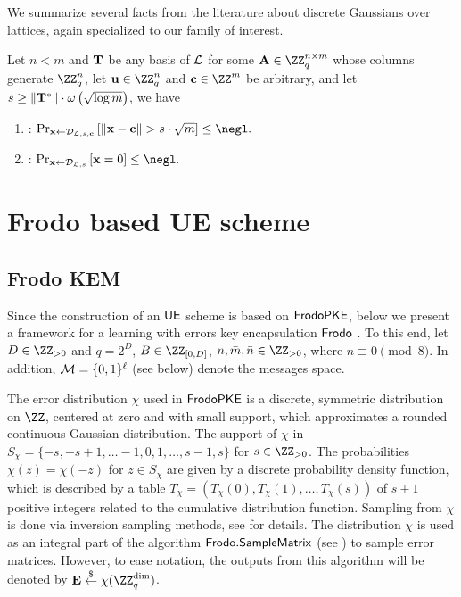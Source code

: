 \documentclass{fundam}
\begin{document}
\vspace{0.5cm}
We summarize several facts from the literature about discrete Gaussians over lattices, again specialized to our family of interest.
\begin{lemma}\label{lem::02}Let $n<m$ and $\mathbf{T}$ be any basis of $\mathcal{L}$ for some $\vr{A}\in\ZZ_{q}^{n\times m}$ whose columns generate $\ZZ_{q}^{n}$, let $\vr{u}\in\ZZ_{q}^{n}$ and $\vr{c}\in\ZZ^{m}$
	be arbitrary, and let $s\geq \| \mathbf{T}^{*} \| \cdot \omega \left( \sqrt{\log{m}} \right)$, we have
	\begin{enumerate}
		\item {\normalfont \cite{micciancio2007worst,cash2012bonsai}:}
		$\Pr_{\vr{x}\gets  \Distr_{\Lat,{s}, \vr{c}}} \left[ \| \vr{x}-\vr{c}\| >  s \cdot \sqrt{m} \right]\leq \negl.$
		
		\item {\normalfont \cite{peikert2006efficient,cash2012bonsai}:} 
		$\Pr_{\vr{x}\gets  \Distr_{\Lat,s}} \left[ \vr{x}=0 \right]\leq \negl.$
		
	\end{enumerate}
\end{lemma}


\section{Frodo based UE scheme}
\subsection{Frodo KEM}\label{sec::Frodo}
Since the construction of an $\mathsf{UE}$ scheme is based on $\mathsf{FrodoPKE}$, below we present a framework for a learning with errors key encapsulation $\mathsf{Frodo}$ \cite{Frodo,Frodo2}. To this end, let $D\in\ZZ_{>0}$ and $q=2^{D}$, $B\in\ZZ_{[0,D]}$, $n,\bar{m}, \bar{n}\in \ZZ_{>0}$, where $n\equiv 0 \pmod{8}$. In addition, $\mathcal{M}=\{0,1\}^{\ell}$ (see below) denote the messages space. 

The error distribution $\chi$ used in $\mathsf{FrodoPKE}$ is a discrete, symmetric distribution on $\ZZ$, centered at zero and with small support, which approximates a rounded continuous Gaussian distribution. The support of $\chi$ in $S_{\chi}=\{ -s, -s+1, \ldots -1, 0, 1, \ldots , s-1, s \}$ for $s\in\ZZ_{>0}$. The probabilities $\chi(z) = \chi(-z)$ for $z\in S_{\chi}$ are given by a discrete probability density function, which is described by a table $T_{\chi} = (T_{\chi}(0), T_{\chi}(1), \ldots , T_{\chi}(s))$ of $s+1$ positive integers related to the cumulative distribution function. Sampling from $\chi$ is done via inversion sampling methods, see \cite{Frodo,Frodo2} for details.
The distribution $\chi$ is used as an integral part of the algorithm $\mathsf{Frodo.SampleMatrix}$ (see \cite{Frodo,Frodo2}) to sample error matrices. However, to ease notation, the outputs from this algorithm will be denoted by $\vr{E}\sample \chi(\ZZ_{q}^{\dim})$. 
\end{document}
